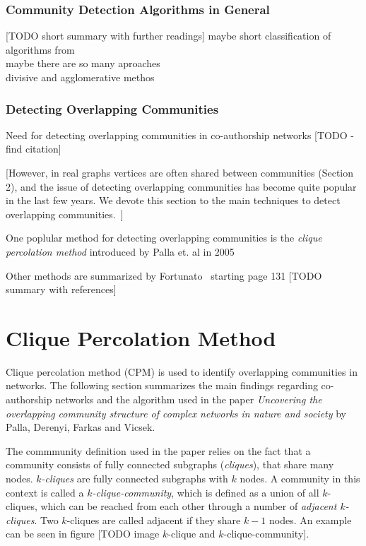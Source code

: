 \documentclass[runningheads,a4paper]{llncs}
\begin{document}
\subsubsection{Community Detection Algorithms in General}
[TODO short summary with further readings]
maybe short classification of algorithms from~\cite{fortunato2010community}\\
maybe there are so many aproaches\\
divisive and agglomerative methos\\

\subsubsection{Detecting Overlapping Communities}
Need for detecting overlapping communities in co-authorship networks [TODO - find citation]

[However, in real graphs vertices are often shared between communities (Section 2), and the issue of detecting overlapping communities has become quite popular in the last few years. We devote this section to the main techniques to detect overlapping communities.~\cite{fortunato2010community}]

One poplular method for detecting overlapping communities is the \emph{clique percolation method} introduced by Palla et. al in 2005~\cite{palla2005uncovering}

Other methods are summarized by Fortunato~\cite{fortunato2010community} starting page 131 [TODO summary with references]

\section{Clique Percolation Method}
\label{cpm}
Clique percolation method (CPM) is used to identify overlapping communities in networks. The following section summarizes the main findings regarding co-authorship networks and the algorithm used in the paper \emph{Uncovering the overlapping community structure of complex networks in nature and society} by Palla, Derenyi, Farkas and Vicsek.

The commmunity definition used in the paper relies on the fact that a community consists of fully connected subgraphs (\emph{cliques}), that share many nodes. \emph{$k$-cliques} are fully connected subgraphs with $k$ nodes. A community in this context is called a \emph{$k$-clique-community}, which is defined as a union of all $k$-cliques, which can be reached from each other through a number of \emph{adjacent $k$-cliques}. Two $k$-cliques are called adjacent if they share $k-1$ nodes. An example can be seen in figure [TODO image $k$-clique and $k$-clique-community].
\end{document}
